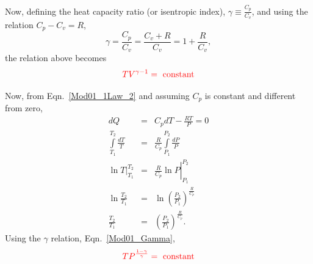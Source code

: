 \documentclass[12pts,a4paper,amsmath,amssymb,floatfix]{article}%
\newcommand{\frc}{\displaystyle\frac}
\newcommand{\red}{\textcolor{red}}
\begin{document}
\begin{enumerate}[i)]
           Now, defining the heat capacity ratio (or isentropic index), $\gamma\equiv\frc{C_{p}}{C_{v}}$, and using the relation $C_{p}-C_{v}=R$,
           \begin{equation}
              \gamma = \frc{C_{p}}{C_{v}} = \frc{C_{v}+R}{C_{v}} = 1 + \frc{R}{C_{v}},\label{Mod01_Gamma}
           \end{equation}
           the relation above becomes
           \begin{equation}
              \red{TV^{\gamma-1} = \text{ constant}}\label{Mod01_1Law_5}
           \end{equation}

           Now, from Eqn.~\ref{Mod01_1Law_2} and assuming $C_{p}$ is constant and different from zero,
           \begin{eqnarray}
             dQ &=& C_{p}dT - \frc{RT}{P} = 0 \nonumber \\
             \int\limits_{T_{1}}^{T_{2}}\frc{dT}{T} &=& \frc{R}{C_{p}}\int\limits_{P_{1}}^{P_{2}}\frc{dP}{P} \nonumber \\
             \left.\ln{T}\right|_{T_{1}}^{T_{2}} &=& \left.\frc{R}{C_{p}} \ln{P}\right|_{P_{1}}^{P_{2}} \nonumber \\
             \ln{\frc{T_{2}}{T_{1}}} &=& \ln{\left(\frc{P_{2}}{P_{1}}\right)^{\frac{R}{C_{p}}}} \nonumber \\
             \frc{T_{2}}{T_{1}} &=& \left(\frc{P_{2}}{P_{1}}\right)^{\frac{R}{C_{p}}}.\nonumber
           \end{eqnarray}
            Using the $\gamma$ relation, Eqn.~\ref{Mod01_Gamma},
           \begin{equation}
              \red{TP^{\frac{1-\gamma}{\gamma}} = \text{ constant}}\label{Mod01_1Law_6}
           \end{equation}


\end{enumerate}
\end{document}
